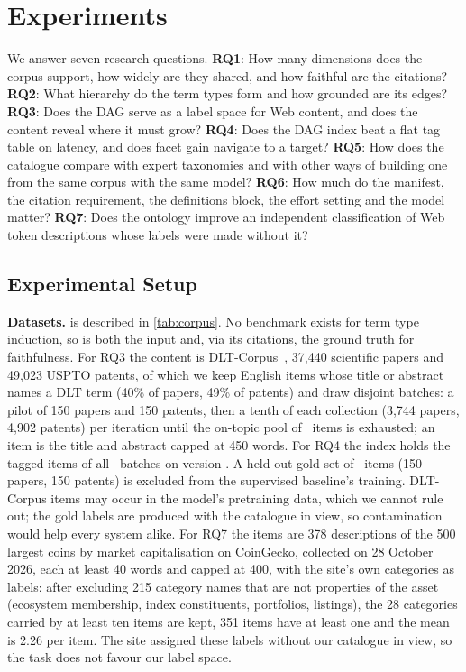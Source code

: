 \section{Experiments}
\label{sec:exp}

We answer seven research questions.
\textbf{RQ1}: How many dimensions does the corpus support, how widely are
they shared, and how faithful are the citations?
\textbf{RQ2}: What hierarchy do the term types form and how grounded are its
edges?
\textbf{RQ3}: Does the DAG serve as a label space for Web content, and does
the content reveal where it must grow?
\textbf{RQ4}: Does the DAG index beat a flat tag table on latency, and does
facet gain navigate to a target?
\textbf{RQ5}: How does the catalogue compare with expert taxonomies and with
other ways of building one from the same corpus with the same model?
\textbf{RQ6}: How much do the manifest, the citation requirement, the
definitions block, the effort setting and the model matter?
\textbf{RQ7}: Does the ontology improve an independent classification of Web
token descriptions whose labels were made without it?

\subsection{Experimental Setup}
\label{sec:exp:setup}

\textbf{Datasets.} \corpus is described in \cref{tab:corpus}. No benchmark
exists for term type induction, so \corpus is both the input and, via its
citations, the ground truth for faithfulness. For RQ3 the
content is DLT-Corpus~\cite{hernandez2026dltcorpus}, 37,440 scientific papers
and 49,023 USPTO patents, of which we keep English items whose title or
abstract names a DLT term (40\% of papers, 49\% of patents) and draw disjoint
batches: a pilot of 150 papers and 150 patents, then a tenth of each
collection (3,744 papers, 4,902 patents) per iteration until the on-topic
pool of \AllItems\ items is exhausted; an item is the title and abstract
capped at 450 words. For RQ4 the index holds the tagged
items of all \RIterWord\ batches on version \RCat. A held-out gold set of \GItems\ items (150 papers, 150
patents) is excluded from the supervised baseline's training. DLT-Corpus items may occur in the model's pretraining data, which we
cannot rule out; the gold labels are produced with the catalogue in view, so
contamination would help every system alike. For RQ7 the items are 378
descriptions of the 500 largest coins by market capitalisation on CoinGecko,
collected on 28 October 2026, each at least 40 words and capped at 400, with
the site's own categories as labels: after excluding 215 category names that
are not properties of the asset (ecosystem membership, index constituents,
portfolios, listings), the 28 categories carried by at least ten items are
kept, 351 items have at least one and the mean is 2.26 per item. The site
assigned these labels without our catalogue in view, so the task does not
favour our label space.

